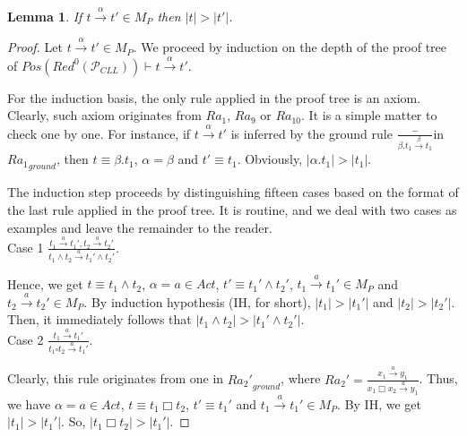 \documentclass{elsarticle}
\theoremstyle{plain}
\newtheorem{lemma}[theorem]{Lemma}
\theoremstyle{definition}
\begin{document}
\begin{lemma}\label{L:POS}
    If $t\stackrel{\alpha}{\longrightarrow} t'\in M_P$ then $|t|>|t'|$.
\end{lemma}
\begin{proof}
Let $t\stackrel{\alpha}{\longrightarrow} t' \in M_P$.
 We proceed by induction on the depth of the proof tree of $Pos(Red^0({\mathcal P}_{CLL})) \vdash t\stackrel{\alpha}{\longrightarrow} t'$.

For the induction basis, the only rule applied in the proof tree is an axiom.
Clearly, such axiom originates from $Ra_1$, $Ra_9$ or $Ra_{10}$.
It is a simple matter to check one by one.
For instance, if $t\stackrel{\alpha}{\longrightarrow} t'$ is inferred by the ground rule $\frac{-}{\beta.t_1\stackrel{\beta}{\longrightarrow}t_1}$in ${Ra_1}_{ground}$, then $t \equiv \beta.t_1$, $\alpha = \beta$ and $t' \equiv t_1$. Obviously, $|\alpha.t_1|>|t_1|$.

The induction step proceeds by distinguishing fifteen cases based on the format of the last rule applied in the proof tree.
It is routine, and we deal with two cases as examples and leave the remainder to the reader.\\

\noindent Case 1 $\frac{t_1 \stackrel{a}{\longrightarrow} t_1', t_2 \stackrel{a}{\longrightarrow}t_2'}{t_1 \wedge t_2 \stackrel{a}{\longrightarrow} t_1' \wedge t_2'}$.

Hence, we get $t \equiv t_1 \wedge t_2$, $\alpha = a \in Act$, $t' \equiv t_1'\wedge t_2'$, $t_1\stackrel{a}{\longrightarrow} t_1' \in M_P$ and $t_2\stackrel{a}{\longrightarrow} t_2' \in M_P$. By induction hypothesis (IH, for short), $|t_1|>|t_1'|$ and $|t_2|>|t_2'|$.
Then, it immediately follows that $|t_1 \wedge t_2|>|t_1' \wedge t_2'|$.\\

\noindent Case 2 $\frac{t_1 \stackrel{a}{\longrightarrow} t_1'}{t_1 \square t_2 \stackrel{a}{\longrightarrow} t_1'}$.

Clearly, this rule originates from one in ${Ra_2'}_{ground}$, where $Ra_2'=\frac{x_1 \stackrel{a}{\longrightarrow} y_1}{x_1 \Box x_2 \stackrel{a}{\longrightarrow} y_1}$.
Thus, we have $\alpha = a \in Act$, $t \equiv t_1 \Box t_2$, $t' \equiv t_1'$ and $t_1\stackrel{a}{\longrightarrow} t_1' \in M_P$.
By IH, we get $|t_1|>|t_1'|$.
So, $|t_1 \Box t_2|>|t_1'|$.
\end{proof}
\end{document}
